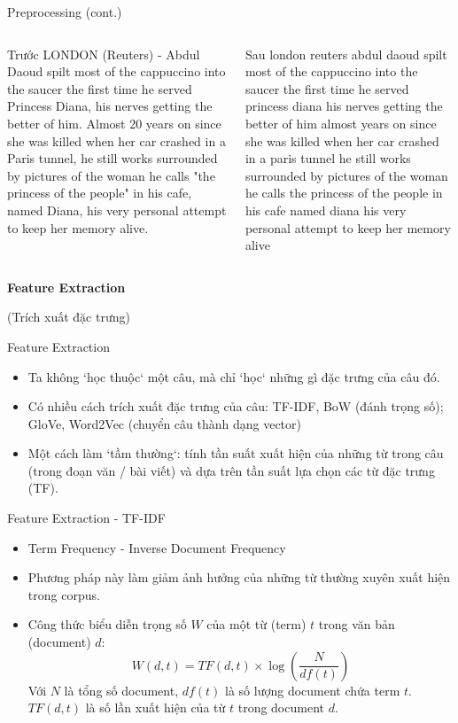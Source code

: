 \documentclass[aspectratio=169,xcolor=dvipsnames]{beamer}
\begin{document}
\begin{frame}{Preprocessing (cont.)}
\begin{columns}[c]

\begin{block}{Trước}
LONDON (Reuters) - Abdul Daoud spilt most of the cappuccino into the saucer the first time he served Princess Diana, his nerves getting the better of him. Almost 20 years on since she was killed when her car crashed in a Paris tunnel, he still works surrounded by pictures of the woman he calls "the princess of the people" in his cafe, named Diana, his very personal attempt to keep her memory alive.
\end{block}
\pause
{}
\begin{block}{Sau}
london  reuters    abdul daoud spilt most of the cappuccino into the saucer the first time he served princess diana  his nerves getting the better of him  almost  years on since she was killed when her car crashed in a paris tunnel  he still works surrounded by pictures of the woman he calls  the princess of the people  in his cafe  named diana  his very personal attempt to keep her memory alive 
\end{block}
\end{columns}
\end{frame}

\begin{frame}
	\Huge{\centerline{\textbf{Feature Extraction}}}
	\centerline{(Trích xuất đặc trưng)}
\end{frame}

\begin{frame}{Feature Extraction}
\begin{itemize}
\item Ta không `học thuộc` một câu, mà chỉ `học` những gì đặc trưng của câu đó.
\item Có nhiều cách trích xuất đặc trưng của câu: TF-IDF, BoW (đánh trọng số); GloVe, Word2Vec (chuyển câu thành dạng vector)
\item Một cách làm `tầm thường`: tính tần suất xuất hiện của những từ trong câu (trong đoạn văn / bài viết) và dựa trên tần suất lựa chọn các từ đặc trưng (TF).
\end{itemize}
\end{frame}

\begin{frame}{Feature Extraction - TF-IDF}
\begin{itemize}
\item Term Frequency - Inverse Document Frequency
\item Phương pháp này làm giảm ảnh hưởng của những từ thường xuyên xuất hiện trong corpus.
\item Công thức biểu diễn trọng số $W$ của một từ (term) $t$ trong văn bản (document) $d$:
$$
W(d, t) = TF(d, t) \times \log\left(\frac{N}{df(t)}\right)
$$
Với $N$ là tổng số document, $df(t)$ là số lượng document chứa term $t$. $TF(d, t)$ là số lần xuất hiện của từ $t$ trong document $d$.
\end{itemize}
\end{frame}
\end{document}
